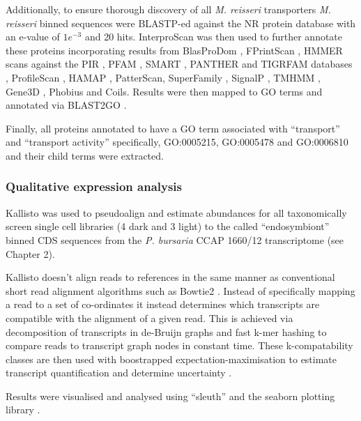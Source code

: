 Additionally, to ensure thorough discovery of 
all \textit{M. reisseri} transporters \textit{M. reisseri} binned sequences 
were BLASTP-ed against the NR protein database with an e-value of \(1e^{-3}\) and 20 hits.
InterproScan \citep{Zdobnov2001a} was then used to 
further annotate these proteins incorporating
results from BlasProDom \citep{Servant2002}, FPrintScan \citep{Attwood1994}, 
HMMER \citep{Eddy2001} scans against the PIR \citep{Barker1998}, PFAM \citep{Bateman2002}, 
SMART \citep{Schultz1998}, PANTHER \citep{Thomas2003a} and TIGRFAM databases \citep{Haft2003}, 
ProfileScan \citep{Gribskov1988},
HAMAP \citep{Lima2009}, PatterScan, 
SuperFamily \citep{Gough2002}, 
SignalP \citep{Petersen2011}, TMHMM \citep{Sonnhammer1998}, 
Gene3D \citep{Buchan2002}, Phobius \citep{Kall2007}
and Coils. Results were then mapped to GO terms \citep{Ashburner2000,Harris2004}
and annotated via BLAST2GO \citep{Conesa2005a}.

Finally, all proteins annotated to have a GO term associated with ``transport'' and
``transport activity'' specifically, GO:0005215, GO:0005478 and GO:0006810 and their child
terms were extracted.  

\subsubsection{Qualitative expression analysis}

Kallisto \citep{Bray2015} was used to pseudoalign and estimate abundances for 
all taxonomically screen single cell 
libraries (4 dark and 3 light) to the called ``endosymbiont''
binned CDS sequences from the \textit{P. bursaria} CCAP 1660/12
transcriptome (see Chapter 2).

Kallisto doesn't align reads to references in the same
manner as conventional short read alignment algorithms
such as Bowtie2 \citep{Langmead2012}.  Instead of specifically 
mapping a read to a set of co-ordinates it instead
determines which transcripts are compatible with the alignment 
of a given read.  This is achieved via decomposition of transcripts
in de-Bruijn graphs and fast k-mer hashing to compare reads to transcript
graph nodes in constant time.  These k-compatability classes are then used with
boostrapped expectation-maximisation to estimate transcript quantification and
determine uncertainty \citep{Bray2015}. 

Results were visualised and analysed using ``sleuth'' and the
seaborn plotting library \citep{michael_waskom_2015_19108}.

